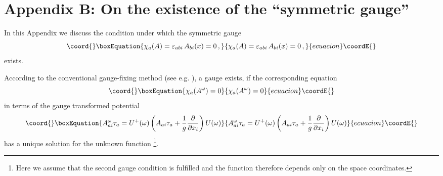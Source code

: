 \documentclass[a4paper,12pt]{article}
\begin{document}

\section*{Appendix B: On the existence of the ``symmetric gauge'' }

\label{ap:B}

In this Appendix we discuss the condition under which the symmetric gauge
\begin{equation}\coord{}\boxEquation{
\label{eq:symmgauge}
\chi_a (A) = \varepsilon_{abi}\,A_{bi}(x) = 0\,,
}{
\chi_a (A) = \varepsilon_{abi}\,A_{bi}(x) = 0\,,
}{ecuacion}\coordE{}\end{equation}
exists.

According to the conventional  gauge-fixing method
(see e.g. \cite{FadSlav}), a gauge \coordHE{} exists,
if the corresponding equation
\begin{equation}\coord{}\boxEquation{
\label{eq:gf}
\chi_a (A^\omega) =0
}{
\chi_a (A^\omega) =0
}{ecuacion}\coordE{}\end{equation}
in terms of the gauge transformed potential
\begin{equation}\coord{}\boxEquation{
\label{eq:gtr}
A^\omega_{ai}\tau_a =
U^+ (\omega)
         \left( A_{ai}\tau_a
         + \frac{1}{g}\frac{\partial}{\partial x_i} \right)U(\omega)
}{
A^\omega_{ai}\tau_a =
U^+ (\omega)
         \left( A_{ai}\tau_a
         + \frac{1}{g}\frac{\partial}{\partial x_i} \right)U(\omega)
}{ecuacion}\coordE{}\end{equation}
has a unique solution for the unknown function \coordHE{}
\footnote{
Here we assume that the second gauge condition \coordHE{} is fulfilled and
the function \coordHE{} therefore depends only on the space coordinates.}.
\end{document}
